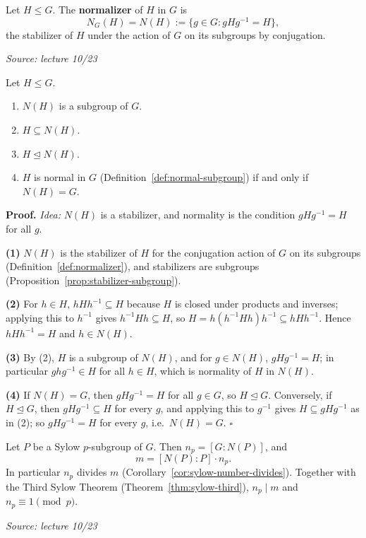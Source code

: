 \documentclass[11pt]{report}
\renewenvironment{proof}[1][Proof]{\noindent\textbf{#1.} }{\hfill$\square$\par\vspace{5pt}}
\newcommand{\srcline}[1]{\par\hfill{\footnotesize\textit{Source: #1}}}
\begin{document}
\begin{defbox}[{Normalizer}]\label{def:normalizer}
Let $H \leq G$. The \textbf{normalizer} of $H$ in $G$ is
\[ N_G(H) = N(H) := \{ g \in G : gHg^{-1} = H \}, \]
the stabilizer of $H$ under the action of $G$ on its subgroups by conjugation.
\srcline{lecture 10/23}
\end{defbox}

\begin{propbox}\label{prop:normalizer-basic-properties}
Let $H \leq G$.
\begin{enumerate}
    \item $N(H)$ is a subgroup of $G$.
    \item $H \subseteq N(H)$.
    \item $H \trianglelefteq N(H)$.
    \item $H$ is normal in $G$ (Definition~\ref{def:normal-subgroup}) if and only if $N(H) = G$.
\end{enumerate}
\end{propbox}

\begin{proof}
\textit{Idea:} $N(H)$ is a stabilizer, and normality is the condition $gHg^{-1} = H$ for all $g$.\par
\textbf{(1)} $N(H)$ is the stabilizer of $H$ for the conjugation action of $G$ on its subgroups (Definition~\ref{def:normalizer}), and stabilizers are subgroups (Proposition~\ref{prop:stabilizer-subgroup}).

\textbf{(2)} For $h \in H$, $hHh^{-1} \subseteq H$ because $H$ is closed under products and inverses; applying this to $h^{-1}$ gives $h^{-1}Hh \subseteq H$, so $H = h(h^{-1}Hh)h^{-1} \subseteq hHh^{-1}$. Hence $hHh^{-1} = H$ and $h \in N(H)$.

\textbf{(3)} By (2), $H$ is a subgroup of $N(H)$, and for $g \in N(H)$, $gHg^{-1} = H$; in particular $ghg^{-1} \in H$ for all $h \in H$, which is normality of $H$ in $N(H)$.

\textbf{(4)} If $N(H) = G$, then $gHg^{-1} = H$ for all $g \in G$, so $H \trianglelefteq G$. Conversely, if $H \trianglelefteq G$, then $gHg^{-1} \subseteq H$ for every $g$, and applying this to $g^{-1}$ gives $H \subseteq gHg^{-1}$ as in (2); so $gHg^{-1} = H$ for every $g$, i.e.\ $N(H) = G$.
\end{proof}

\begin{propbox}\label{prop:np-normalizer-index}
Let $P$ be a Sylow $p$-subgroup of $G$. Then $n_p = [G : N(P)]$, and
\[ m = [N(P) : P] \cdot n_p. \]
In particular $n_p$ divides $m$ (Corollary~\ref{cor:sylow-number-divides}). Together with the Third Sylow Theorem (Theorem~\ref{thm:sylow-third}), $n_p \mid m$ and $n_p \equiv 1 \pmod p$.
\srcline{lecture 10/23}
\end{propbox}
\end{document}
